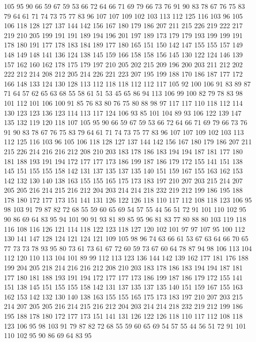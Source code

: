 105 95 90 66 59 67 59 53 66 72 64 66 71 69 79 66 73 76 91 90
83 78 67 76 75 83 79 64 61 71 74 73 75 77 83 96 107 107 109 102
103 113 112 125 116 103 96 105 106 118 128 127 137 144 142 156 167 180 179 186
207 211 215 226 219 222 217 219 210 205 199 191 191 189 194 196 201 197 189 173
179 179 193 199 199 191 178 180 191 177 178 183 184 189 177 180 165 151 150 142
147 155 155 157 149 148 149 148 141 136 124 138 145 159 166 158 158 156 145 130
122 124 146 139 157 162 160 162 178 175 179 197 210 205 202 215 209 196 200 203
211 212 202 222 212 214 208 212 205 214 226 221 223 207 195 199 188 170 186 187
177 172 166 148 133 124 130 128 113 112 118 118 112 112 117 105 92 100 106 91
83 89 87 71 64 57 62 65 63 68 55 58 61 51 53 45 65 86 94 113
106 99 100 82 79 78 83 98 101 112 101 106 100 91 85 76 83 80 76 75
80 88 98 97 117 117 110 118 112 114 130 123 123 136 123 114 113 117 124 106
93 85 101 104 89 93 106 122 139 147 135 132 119 120 118 107 105 95 90 66
59 67 59 53 66 72 64 66 71 69 79 66 73 76 91 90 83 78 67 76
75 83 79 64 61 71 74 73 75 77 83 96 107 107 109 102 103 113 112 125
116 103 96 105 106 118 128 127 137 144 142 156 167 180 179 186 207 211 215 226
214 216 216 212 208 210 203 183 178 186 183 194 194 187 181 177 180 181 188 193
191 194 172 177 177 173 186 199 187 186 179 172 155 141 151 138 145 151 155 155
158 142 131 137 135 137 135 140 151 159 167 155 163 162 153 142 132 130 140 138
163 155 155 165 175 173 183 197 210 207 203 215 214 207 205 205 216 214 215 216
212 204 203 214 214 218 232 219 212 199 186 195 188 178 180 172 177 173 151 141
131 126 122 126 118 110 117 112 108 118 123 106 95 98 103 91 79 87 82 72
68 55 59 60 65 69 54 57 55 44 56 51 72 91 101 110 102 95 90 86
69 64 83 95 94 101 90 91 93 81 89 85 95 96 81 83 77 80 88 80
103 119 118 116 108 116 126 121 114 118 122 123 118 127 120 102 101 97 97 107
95 100 112 130 141 147 128 124 121 124 121 109 105 98 96 74 63 66 61 53
67 63 64 66 70 65 77 73 73 78 93 95 80 73 61 73 61 67 72 60
59 73 67 60 64 78 87 94 98 106 113 104 112 120 110 113 104 101 89 99
112 113 123 136 144 142 139 162 177 181 176 188 199 204 205 218 214 216 216 212
208 210 203 183 178 186 183 194 194 187 181 177 180 181 188 193 191 194 172 177
177 173 186 199 187 186 179 172 155 141 151 138 145 151 155 155 158 142 131 137
135 137 135 140 151 159 167 155 163 162 153 142 132 130 140 138 163 155 155 165
175 173 183 197 210 207 203 215 214 207 205 205 216 214 215 216 212 204 203 214
214 218 232 219 212 199 186 195 188 178 180 172 177 173 151 141 131 126 122 126
118 110 117 112 108 118 123 106 95 98 103 91 79 87 82 72 68 55 59 60
65 69 54 57 55 44 56 51 72 91 101 110 102 95 90 86 69 64 83 95
